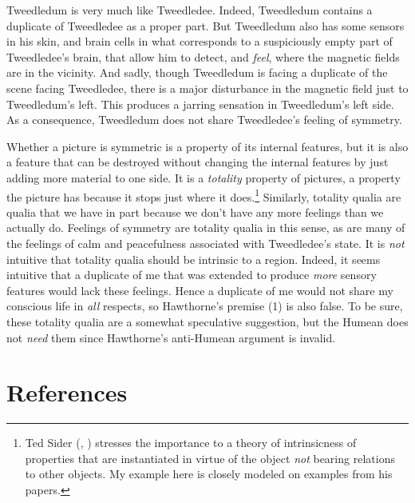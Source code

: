 \documentclass[
  10pt,
  letterpaper,
  DIV=11,
  numbers=noendperiod,
  twoside]{scrartcl}
\begin{document}
Tweedledum is very much like Tweedledee. Indeed, Tweedledum contains a
duplicate of Tweedledee as a proper part. But Tweedledum also has some
sensors in his skin, and brain cells in what corresponds to a
suspiciously empty part of Tweedledee's brain, that allow him to detect,
and \emph{feel}, where the magnetic fields are in the vicinity. And
sadly, though Tweedledum is facing a duplicate of the scene facing
Tweedledee, there is a major disturbance in the magnetic field just to
Tweedledum's left. This produces a jarring sensation in Tweedledum's
left side. As a consequence, Tweedledum does not share Tweedledee's
feeling of symmetry.

Whether a picture is symmetric is a property of its internal features,
but it is also a feature that can be destroyed without changing the
internal features by just adding more material to one side. It is a
\emph{totality} property of pictures, a property the picture has because
it stops just where it does.\footnote{Ted Sider
  (, )
  stresses the importance to a theory of intrinsicness of properties
  that are instantiated in virtue of the object \emph{not} bearing
  relations to other objects. My example here is closely modeled on
  examples from his papers.} Similarly, totality qualia are qualia that
we have in part because we don't have any more feelings than we actually
do. Feelings of symmetry are totality qualia in this sense, as are many
of the feelings of calm and peacefulness associated with Tweedledee's
state. It is \emph{not} intuitive that totality qualia should be
intrinsic to a region. Indeed, it seems intuitive that a duplicate of me
that was extended to produce \emph{more} sensory features would lack
these feelings. Hence a duplicate of me would not share my conscious
life in \emph{all} respects, so Hawthorne's premise (1) is also false.
To be sure, these totality qualia are a somewhat speculative suggestion,
but the Humean does not \emph{need} them since Hawthorne's anti-Humean
argument is invalid.

\section*{References}\label{references}
\end{document}
